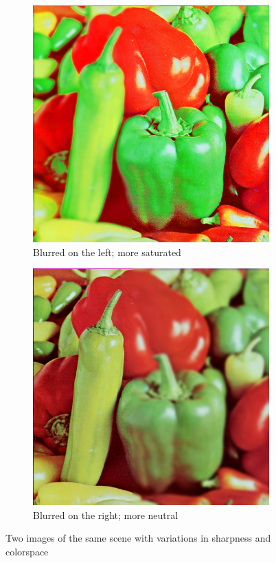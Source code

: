 \documentclass[sigconf]{acmart/acmart}
\begin{document}
\begin{figure}[h]
	\centering
	\begin{subfigure}[b]{0.45\textwidth}
		\centering
		\includegraphics[width=\textwidth]{figures/peppers/peppers_blur_left}
		\caption{Blurred on the left; more saturated}
	\end{subfigure}
	\begin{subfigure}[b]{0.45\textwidth}
		\centering
		\includegraphics[width=\textwidth]{figures/peppers/peppers_blur_right}
		\caption{Blurred on the right; more neutral}
	\end{subfigure}
	\caption{Two images of the same scene with variations in sharpness and colorspace}
	\label{fig_peppers_lr}
\end{figure}
\end{document}
